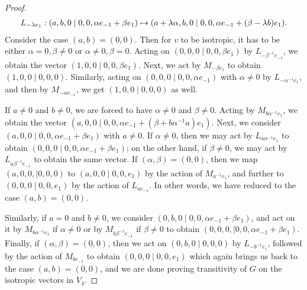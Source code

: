 \begin{proof}
\begin{equation*}
\begin{array}{r@{\;}c@{\;}l}
			L_{-\lambda e_{1}} :  (a, b, 0 \mid 0,0, \alpha e_{-1} + \beta e_{1}) & \mapsto & 
						 (a + \lambda \alpha, b , 0 \mid 0,0, \alpha e_{-1} + (\beta - \lambda b) e_{1}). 
		\end{array}
	\end{equation*}
	Consider the case $(a, b) = (0,0)$. Then for $v$ to be isotropic, it has to be either $\alpha = 0, \beta \neq 0$ or 
	$\alpha \neq 0, \beta = 0$. Acting on $(0,0,0\mid 0,0,\beta e_1)$ by $L_{-\beta^{-1} e_{-1}}$, we obtain the vector
	$(1,0,0 \mid 0,0,\beta e_1)$. Next, we act by $M_{-\beta e_1}$ to obtain $(1,0,0 \mid 0,0,0)$. Similarly,
	acting on $(0,0,0 \mid 0,0,\alpha e_{-1})$ with $\alpha \neq 0$ by $L_{-\alpha^{-1} e_{1}}$, and then by $M_{-\alpha e_{-1}}$, 
	we get $(1,0,0 \mid 0,0,0)$ as well.
	
	If $a \neq 0$ and $b \neq 0$, we are forced to have $\alpha \neq 0$ and $\beta \neq 0$. Acting by $M_{b \alpha^{-1} e_{1}}$, 
	we obtain the vector $(a,0,0 \mid 0,0, \alpha e_{-1} + (\beta + b \alpha^{-1} a) e_1)$. Next, we consider $(a,0,0 \mid 0,0, \alpha e_{-1} + \beta e_{1})$
	with $a \neq 0$. If $\alpha \neq 0$, then we may act by $L_{a\alpha^{-1} e_1}$ to obtain $(0,0,0 \mid 0,0,\alpha e_{-1} + \beta e_1)$; on the other hand,
	if $\beta \neq 0$, we may act by $L_{a\beta^{-1} e_{-1}}$ to obtain the same vector. If $(\alpha, \beta) = (0,0)$, then we map 
	$(a,0,0, \mid 0,0,0)$ to $(a,0,0 \mid 0,0,e_1)$ by the action of $M_{a^{-1} e_1}$, and further to $(0,0,0 \mid 0,0,e_1)$ by the action of $L_{a e_{-1}}$. 
	In other words, we have reduced to the case $(a, b) = (0, 0)$. 
	
	Similarly, if $a = 0$ and $b \neq 0$, we consider $(0,b,0 \mid 0,0, \alpha e_{-1} + \beta e_1)$, and act on it by $M_{b\alpha^{-1} e_1}$ if $\alpha \neq 0$
	or by $M_{b\beta^{-1} e_{-1}}$ if $\beta \neq 0$ to obtain $(0,0,0, \mid 0,0,\alpha e_{-1} + \beta e_1)$. Finally, if $(\alpha, \beta) = (0, 0)$, then
	we act on $(0,b,0 \mid 0,0,0)$ by $L_{-b^{-1} e_1}$, followed by the action of $M_{b e_{-1}}$ to obtain $(0,0,0 \mid 0,0,e_1)$ which again 
	brings us back to the case $(a, b) = (0,0)$, and we are done proving transitivity of $G$ on the isotropic vectors in $V_4$.
	

\end{proof}
